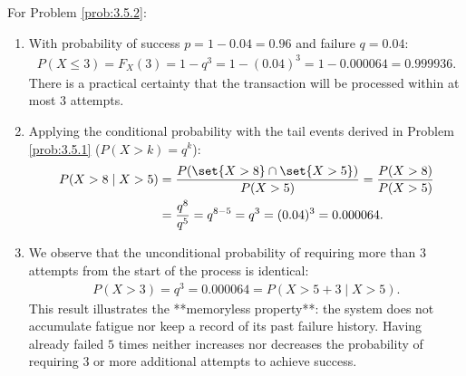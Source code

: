 \begin{solucion}
	\label{sol:3.5.2}
	For Problem \ref{prob:3.5.2}:
	\begin{enumerate}
		\item With probability of success $p = 1 - 0.04 = 0.96$ and failure $q = 0.04$:
		\begin{align*}
			P(X \le 3) = F_X(3) = 1 - q^3 = 1 - (0.04)^3 = 1 - 0.000064 = 0.999936.
		\end{align*}
		There is a practical certainty that the transaction will be processed within at most $3$ attempts.
		\item Applying the conditional probability with the tail events derived in Problem \ref{prob:3.5.1} ($P(X > k) = q^k$):
		\begin{align*}
			P(X > 8 \mid X > 5) &= \dfrac{P(\set{X > 8} \cap \set{X > 5})}{P(X > 5)} = \dfrac{P(X > 8)}{P(X > 5)} \\
			&= \dfrac{q^8}{q^5} = q^{8-5} = q^3 = (0.04)^3 = 0.000064.
		\end{align*}
		\item We observe that the unconditional probability of requiring more than $3$ attempts from the start of the process is identical:
		\begin{align*}
			P(X > 3) = q^3 = 0.000064 = P(X > 5 + 3 \mid X > 5).
		\end{align*}
		This result illustrates the **memoryless property**: the system does not accumulate fatigue nor keep a record of its past failure history. Having already failed $5$ times neither increases nor decreases the probability of requiring $3$ or more additional attempts to achieve success.
	\end{enumerate}
\end{solucion}

